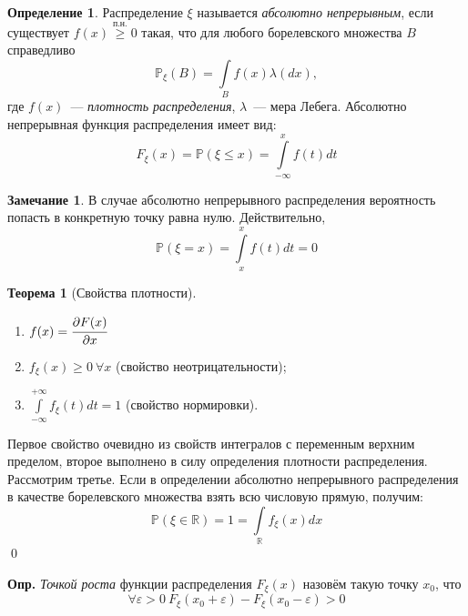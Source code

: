 \documentclass[oneside,final,14pt]{extreport}
\newcommand\mydef{{\bf Опр.}}
\renewenvironment{proof}{{\bfseries Доказательство.}}{\qed}
\theoremstyle{plain}
\theoremstyle{definition}
\newtheorem*{defn}{Определение}
\newtheorem*{rmrk}{Замечание}
\theoremstyle{named}
\newtheorem*{namedthm}{Теорема}
\begin{document}
\begin{defn}
    Распределение $\xi$ называется {\it абсолютно непрерывным}, если существует $f(x) \overset{\text{п.н.}}{\geqslant} 0$ такая, что для любого борелевского множества $B$ справедливо
    \begin{equation*}
        \mathbb{P}_\xi(B) = \int\limits_B f(x) \lambda(dx),
    \end{equation*}
    где $f(x)$~--- {\it плотность распределения}, $\lambda$~--- мера Лебега. Абсолютно непрерывная функция распределения имеет вид:
    \begin{equation*}
        F_\xi(x) = \mathbb{P}(\xi \leqslant x) = \int\limits_{-\infty}^x f(t)dt
    \end{equation*}
\end{defn}
\begin{rmrk}
    В случае абсолютно непрерывного распределения вероятность попасть в конкретную точку равна нулю. Действительно,
    \begin{equation*}
        \mathbb{P}(\xi = x) = \int\limits_{x}^{x} f(t)dt = 0
    \end{equation*}
\end{rmrk}
\begin{namedthm}[Свойства плотности]\leavevmode
\begin{enumerate}
    \item $f(x) = \cfrac{\partial F(x)}{\partial x}$
    \item $f_\xi(x) \geqslant 0~ \forall x$ (свойство неотрицательности);
    \item $\int\limits_{-\infty}^{+\infty} f_\xi(t) dt = 1$ (свойство нормировки).
\end{enumerate}
\end{namedthm}
\begin{proof}
    Первое свойство очевидно из свойств интегралов с переменным верхним пределом, второе выполнено в силу определения плотности распределения. Рассмотрим третье. Если в определении абсолютно непрерывного распределения в качестве борелевского множества взять всю числовую прямую, получим: 
    \begin{equation*}
        \mathbb{P}(\xi \in \mathbb{R})=1=\int\limits_{\mathbb{R}} f_{\xi}(x) dx
    \end{equation*}
\end{proof}

\mydef{} {\it Точкой роста} функции распределения $F_\xi(x)$ назовём такую точку $x_0$, что
\begin{equation*}
    \forall \varepsilon > 0~ F_\xi(x_0 + \varepsilon) - F_\xi(x_0 - \varepsilon) > 0
\end{equation*}
\end{document}
